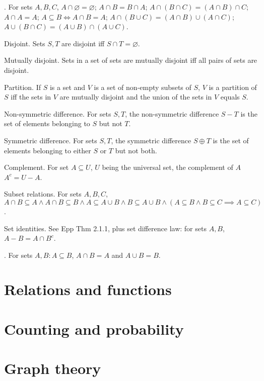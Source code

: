 \documentclass{slnotes}
\begin{document}
. For sets \(A, B, C\), \(A\cap\varnothing=\varnothing\); \(A\cap B=B\cap A\); \(A\cap (B\cap C) = (A\cap B)\cap C\); \(A\cap A = A\); \(A \subseteq B \Leftrightarrow A\cap B = A\); \(A \cap (B \cup C) = (A \cap B) \cup (A \cap C)\); \(A \cup (B \cap C) = (A \cup B) \cap (A \cup C)\).

 Disjoint. Sets \(S, T\) are disjoint iff \(S \cap T = \varnothing\).

 Mutually disjoint. Sets in a set of sets are mutually disjoint iff all pairs of sets are disjoint.

 Partition. If \(S\) is a set and \(V\) is a set of non-empty subsets of \(S\), \(V\) is a partition of \(S\) iff the sets in \(V\) are mutually disjoint and the union of the sets in \(V\) equals \(S\).

 Non-symmetric difference. For sets \(S, T\), the non-symmetric difference \(S - T\) is the set of elements belonging to \(S\) but not \(T\).

 Symmetric difference. For sets \(S, T\), the symmetric difference \(S \oplus T\) is the set of elements belonging to either \(S\) or \(T\) but not both.

 Complement. For set \(A \subseteq U\), \(U\) being the universal set, the complement of \(A\) \(A^c = U - A\).

 Subset relations. For sets \(A, B, C\), \(A \cap B \subseteq A \land A \cap B \subseteq B \land A \subseteq A \cup B \land B \subseteq A \cup B \land (A \subseteq B \land B \subseteq C \implies A \subseteq C)\).

 Set identities. See Epp Thm 2.1.1, plus set difference law: for sets \(A, B\), \(A - B = A \cap B^c\).

. For sets \(A, B : A \subseteq B\), \(A \cap B = A\) and \(A \cup B = B\).

\chapter{Relations and functions}

\chapter{Counting and probability}

\chapter{Graph theory}
\end{document}
